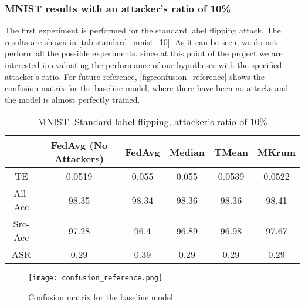 \subsubsection{MNIST results with an attacker's ratio of 10\%}
The first experiment is performed for the standard label flipping attack. The results are shown in \autoref{tab:standard_mnist_10}. 
As it can be seen, we do not perform all the possible experiments, since at this point of the project we are interested in evaluating the performance of our hypotheses with the specified attacker's ratio. For future reference, \autoref{fig:confusion_reference} shows the confusion matrix for the baseline model, where there have been no attacks and the model is almost perfectly trained.
\begin{table}[h]
        \centering
        \begin{tabular}{|c|c|c|c|c|c|}
            \hline
            & FedAvg (No Attackers) & FedAvg & Median & TMean & MKrum\\
            \hline
            TE & 0.0519 & 0.055 & 0.055 & 0.0539 & 0.0522 \\
            \hline
            All-Acc & 98.35 & 98.34 & 98.36 & 98.36 & 98.41 \\
            \hline
            Src-Acc & 97.28 & 96.4 & 96.89 & 96.98 & 97.67 \\
            \hline
            ASR & 0.29 & 0.39 & 0.29 & 0.29 & 0.29 \\
            \hline
        \end{tabular}
        \caption{MNIST. Standard label flipping, attacker's ratio of 10\%}
        \label{tab:standard_mnist_10}
\end{table}

\begin{figure}[h!]
        \centering
        \texttt{[image: confusion\_reference.png]}
        \caption{Confusion matrix for the baseline model}
        \label{fig:confusion_reference}
\end{figure}

